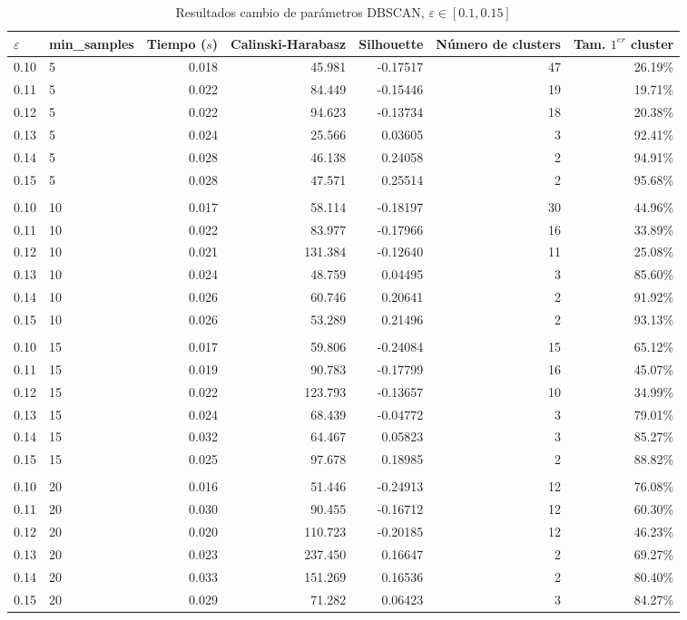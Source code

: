 \documentclass[a4paper, 20pt]{article}
\begin{document}
\begin{table}[H]
\centering
\caption{Resultados cambio de parámetros DBSCAN, $\varepsilon \in [0.1, 0.15]$}
\label{tab:param_dbscan22}
\begin{tabular}{llrrrrr}
\toprule
$\varepsilon$ & min\_samples & Tiempo ($s$) & Calinski-Harabasz & Silhouette & Número de clusters & Tam. $1^{er}$ cluster\\
\midrule
0.10 & 5 & 0.018 & 45.981 & -0.17517 & 47 & 26.19\% \\
0.11 & 5 & 0.022 & 84.449 & -0.15446 & 19 & 19.71\% \\
0.12 & 5 & 0.022 & 94.623 & -0.13734 & 18 & 20.38\% \\
0.13 & 5 & 0.024 & 25.566 & 0.03605 & 3 & 92.41\% \\
0.14 & 5 & 0.028 & 46.138 & 0.24058 & 2 & 94.91\% \\
0.15 & 5 & 0.028 & 47.571 & 0.25514 & 2 & 95.68\% \\
\\
0.10 & 10 & 0.017 & 58.114 & -0.18197 & 30 & 44.96\% \\
0.11 & 10 & 0.022 & 83.977 & -0.17966 & 16 & 33.89\% \\
0.12 & 10 & 0.021 & 131.384 & -0.12640 & 11 & 25.08\% \\
0.13 & 10 & 0.024 & 48.759 & 0.04495 & 3 & 85.60\% \\
0.14 & 10 & 0.026 & 60.746 & 0.20641 & 2 & 91.92\% \\
0.15 & 10 & 0.026 & 53.289 & 0.21496 & 2 & 93.13\% \\
\\
0.10 & 15 & 0.017 & 59.806 & -0.24084 & 15 & 65.12\% \\
0.11 & 15 & 0.019 & 90.783 & -0.17799 & 16 & 45.07\% \\
0.12 & 15 & 0.022 & 123.793 & -0.13657 & 10 & 34.99\% \\
0.13 & 15 & 0.024 & 68.439 & -0.04772 & 3 & 79.01\% \\
0.14 & 15 & 0.032 & 64.467 & 0.05823 & 3 & 85.27\% \\
0.15 & 15 & 0.025 & 97.678 & 0.18985 & 2 & 88.82\% \\
\\
0.10 & 20 & 0.016 & 51.446 & -0.24913 & 12 & 76.08\% \\
0.11 & 20 & 0.030 & 90.455 & -0.16712 & 12 & 60.30\% \\
0.12 & 20 & 0.020 & 110.723 & -0.20185 & 12 & 46.23\% \\
0.13 & 20 & 0.023 & 237.450 & 0.16647 & 2 & 69.27\% \\
0.14 & 20 & 0.033 & 151.269 & 0.16536 & 2 & 80.40\% \\
0.15 & 20 & 0.029 & 71.282 & 0.06423 & 3 & 84.27\% \\
\bottomrule
\end{tabular}
\end{table}
\end{document}

